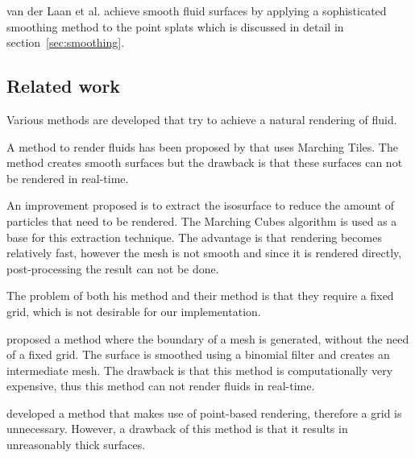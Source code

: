 van der Laan et al. achieve smooth fluid surfaces by applying a sophisticated smoothing method to the point splats which is discussed in detail in section~\ref{sec:smoothing}.

\subsection{Related work}
Various methods are developed that try to achieve a natural rendering of fluid.

A method to render fluids has been proposed by \cite{williams2008fluid} that uses Marching Tiles. 
The method creates smooth surfaces but the drawback is that these surfaces can not be rendered in real-time.

An improvement \cite{rosenberg2008real} proposed is to extract the isosurface to reduce the amount of particles that need to be rendered.
The Marching Cubes algorithm is used as a base for this extraction technique.
The advantage is that rendering becomes relatively fast, however the mesh is not smooth and since it is rendered directly, post-processing the result can not be done.

The problem of both \cite{williams2008fluid} his method and \cite{rosenberg2008real} their method is that they require a fixed grid, which is not desirable for our implementation. 

\cite{muller2007screen} proposed a method where the boundary of a mesh is generated, without the need of a fixed grid.
The surface is smoothed using a binomial filter and creates an intermediate mesh.
The drawback is that this method is computationally very expensive, thus this method can not render fluids in real-time.

\cite{zhang2008adaptive} developed a method that makes use of point-based rendering, therefore a grid is unnecessary.
However, a drawback of this method is that it results in unreasonably thick surfaces.
